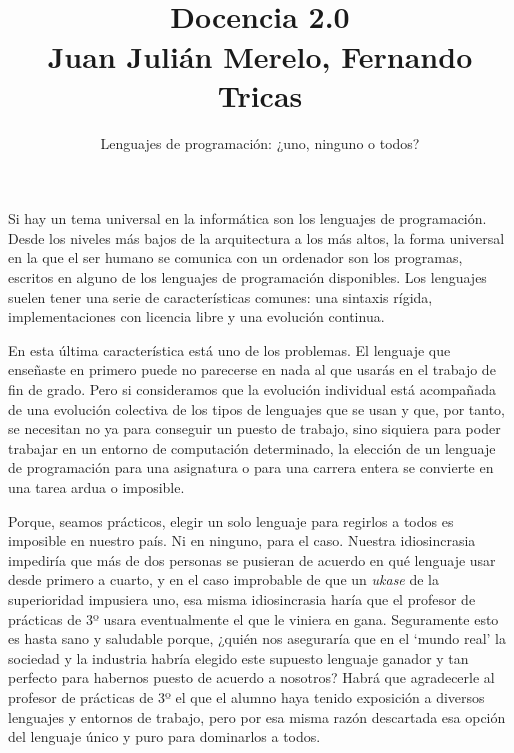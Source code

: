 \documentclass[twoside,10pt]{article}
\title{\ \\ Docencia 2.0\\ \large Juan Juli\'{a}n Merelo, Fernando Tricas}
\author{\LARGE Lenguajes de programación: ¿uno, ninguno o todos?}
\date{}
\newcounter{vol}
\begin{document}
\addtocounter{page}{2}

\maketitle
\vspace*{-5ex}

\begin{multicols}{2}

Si hay un tema universal en la informática son los lenguajes de
programación. Desde los niveles más bajos de la arquitectura a los más
altos, la forma universal en la que el ser humano se comunica con un
ordenador son los programas, escritos en alguno de los lenguajes de
programación disponibles. Los lenguajes suelen tener una serie de
características comunes: una sintaxis rígida, implementaciones con
licencia libre y una evolución continua.

En esta última característica está uno de los problemas. El lenguaje
que enseñaste en primero puede no parecerse en nada al que usarás en
el trabajo de fin de grado. Pero si consideramos que la evolución
individual está acompañada de una evolución colectiva de los tipos de
lenguajes que se usan y que, por tanto, se necesitan no ya para
conseguir un puesto de trabajo, sino siquiera para poder trabajar en
un entorno de computación determinado, la elección de un lenguaje de
programación para una asignatura o para una carrera entera se convierte en
una tarea ardua o imposible.

Porque, seamos prácticos, elegir un solo lenguaje para regirlos a
todos es imposible en nuestro país. Ni en ninguno, para el caso.
Nuestra idiosincrasia impediría que más de dos personas se pusieran de
acuerdo en qué lenguaje usar desde primero a cuarto, y en el caso
improbable de que un {\em ukase} de la superioridad impusiera uno, esa
misma idiosincrasia haría que el profesor de prácticas de 3º usara
eventualmente el que le viniera en gana. 
Seguramente esto es hasta sano y saludable porque, ¿quién nos aseguraría
que en el `mundo real' la sociedad y la industria habría elegido este
supuesto lenguaje ganador y tan perfecto para habernos puesto de acuerdo a
nosotros? Habrá que agradecerle al profesor de prácticas de 3º el que
el alumno  haya tenido exposición a diversos lenguajes y
entornos de trabajo, pero por esa misma razón descartada esa opción
del lenguaje único y puro para dominarlos a todos.


\end{multicols}
\end{document}
